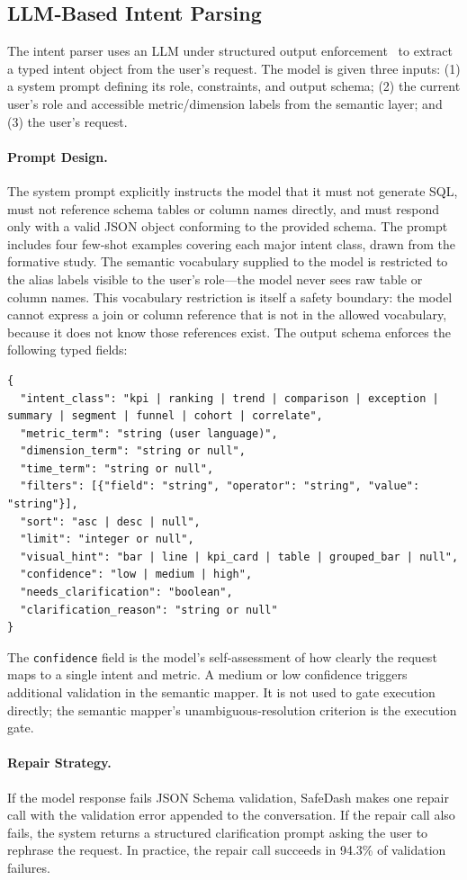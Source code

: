 \documentclass[11pt]{article}
\begin{document}
\subsection{LLM‑Based Intent Parsing}
The intent parser uses an LLM under structured output enforcement~\cite{openai2024structured} to extract a typed intent object from the user's request. The model is given three inputs: (1) a system prompt defining its role, constraints, and output schema; (2) the current user's role and accessible metric/dimension labels from the semantic layer; and (3) the user's request.

\paragraph{Prompt Design.} The system prompt explicitly instructs the model that it must not generate SQL, must not reference schema tables or column names directly, and must respond only with a valid JSON object conforming to the provided schema. The prompt includes four few‑shot examples covering each major intent class, drawn from the formative study. The semantic vocabulary supplied to the model is restricted to the alias labels visible to the user's role—the model never sees raw table or column names. This vocabulary restriction is itself a safety boundary: the model cannot express a join or column reference that is not in the allowed vocabulary, because it does not know those references exist. The output schema enforces the following typed fields:
\begin{verbatim}
{
  "intent_class": "kpi | ranking | trend | comparison | exception | summary | segment | funnel | cohort | correlate",
  "metric_term": "string (user language)",
  "dimension_term": "string or null",
  "time_term": "string or null",
  "filters": [{"field": "string", "operator": "string", "value": "string"}],
  "sort": "asc | desc | null",
  "limit": "integer or null",
  "visual_hint": "bar | line | kpi_card | table | grouped_bar | null",
  "confidence": "low | medium | high",
  "needs_clarification": "boolean",
  "clarification_reason": "string or null"
}
\end{verbatim}
The \texttt{confidence} field is the model's self‑assessment of how clearly the request maps to a single intent and metric. A medium or low confidence triggers additional validation in the semantic mapper. It is not used to gate execution directly; the semantic mapper's unambiguous‑resolution criterion is the execution gate.

\paragraph{Repair Strategy.} If the model response fails JSON Schema validation, SafeDash makes one repair call with the validation error appended to the conversation. If the repair call also fails, the system returns a structured clarification prompt asking the user to rephrase the request. In practice, the repair call succeeds in 94.3\% of validation failures.
\end{document}
